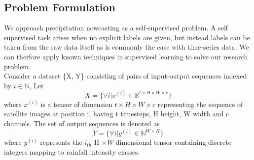 \documentclass[acmtog, authorversion]{acmart}
\begin{document}


\subsection{Problem Formulation}
We approach precipitation nowcasting as a
self-supervised problem. A self supervised task arises when
no explicit labels are given, but instead labels can be taken from the raw data itself
as is commonly the case with time-series data.
We can therfore apply known techniques in supervised learning to solve our research problem.
\\

Consider a dataset \{X, Y\} consisting of pairs of input-output sequences indexed by $i \in \mathbb{N}$,
Let $$X = \{\forall i | x^{(i)} \in \mathbb{R}^{t \times H \times W \times c}\}$$
where $x^{(i)}$ is a tensor of dimension $t \times H \times W \times c$ representing the sequence of satellite images at position i, having t timesteps, H height, W width and c channels.
The set of output sequences is denoted as $$Y = \{\forall i | y^{(i)} \in \mathbb{N}^{W\times H}\}$$
where $y^{(i)}$ represents the $i_{th}$ H $\times W$ dimensional tensor containing discrete integers mapping to rainfall intensity classes.
\end{document}
